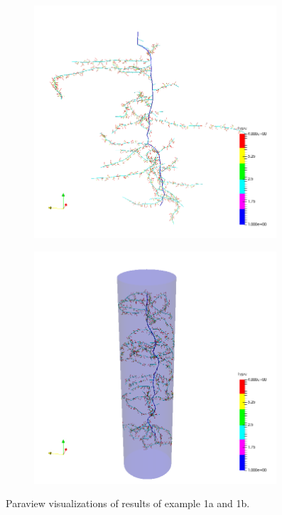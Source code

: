 \begin{figure}
\begin{subfigure}[c]{0.5\textwidth}
\includegraphics[width=0.99\textwidth]{example_1a.png}
 \label{fig:basicA}
\end{subfigure}
\begin{subfigure}[c]{0.5\textwidth}
\includegraphics[width=0.99\textwidth]{example_1b.png}
 \label{fig:basicB}
\end{subfigure}
\caption{Paraview visualizations of results of example 1a and 1b.} 
\end{figure}

